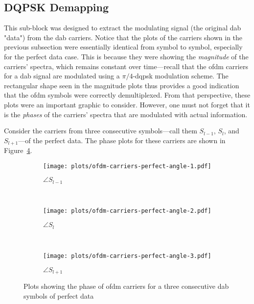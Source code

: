 \documentclass[class=report,11pt,crop=false]{standalone}
\begin{document}
\subsection{DQPSK Demapping \label{subsect:dab-proc_dqpsk-demap}}
This sub-block was designed to extract the modulating signal (the original \gls{dab} "data") from the \gls{dab} carriers. Notice that the plots of the carriers shown in the previous subsection were essentially identical from symbol to symbol, especially for the perfect data case. This is because they were showing the \emph{magnitude} of the carriers' spectra, which remains constant over time---recall that the \gls{ofdm} carriers for a \gls{dab} signal are modulated using a \(\pi/4\)-\gls{dqpsk} modulation scheme. The rectangular shape seen in the magnitude plots thus provides a good indication that the \gls{ofdm} symbols were correctly demultiplexed. From that perspective, these plots were an important graphic to consider. However, one must not forget that it is the \emph{phases} of the carriers' spectra that are modulated with actual information.

Consider the carriers from three consecutive symbols---call them \(S_{l-1}\), \(S_{l}\), and \(S_{l+1}\)---of the perfect data. The phase plots for these carriers are shown in Figure~\ref{fig:ofdm-carriers-perfect-angle}.

\begin{figure}[htbp]
  \centering
  \captionsetup{type=figure}
  \begin{subfigure}[t]{0.3\textwidth}
    \centering
    \captionsetup{type=figure}
    \texttt{[image: plots/ofdm-carriers-perfect-angle-1.pdf]}
    \caption{\(\angle S_{l-1}\)}
    \label{fig:ofdm-carriers-perfect-angle-1}
  \end{subfigure}%
  ~ 
  \begin{subfigure}[t]{0.3\textwidth}
    \centering
    \captionsetup{type=figure}
    \texttt{[image: plots/ofdm-carriers-perfect-angle-2.pdf]}
    \caption{\(\angle S_{l}\)}
    \label{fig:ofdm-carriers-perfect-angle-2}
  \end{subfigure}
  ~ 
  \begin{subfigure}[t]{0.3\textwidth}
    \centering
    \captionsetup{type=figure}
    \texttt{[image: plots/ofdm-carriers-perfect-angle-3.pdf]}
    \caption{\(\angle S_{l+1}\)}
    \label{fig:ofdm-carriers-perfect-angle-3}
  \end{subfigure}
  \caption{Plots showing the phase of \gls{ofdm} carriers for a three consecutive \gls{dab} symbols of perfect data}
  \label{fig:ofdm-carriers-perfect-angle}
\end{figure}
\end{document}
